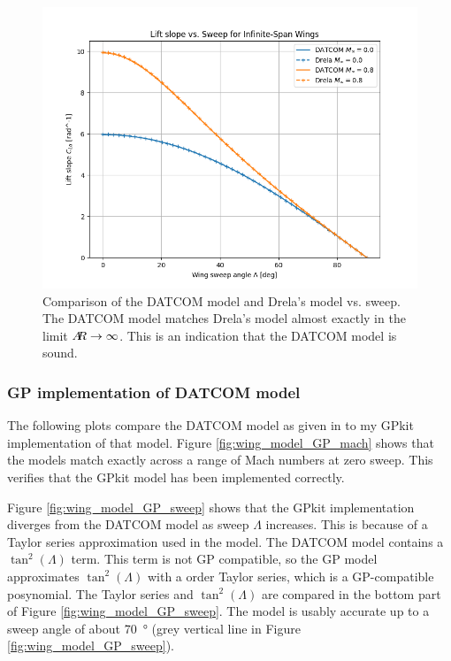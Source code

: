 \documentclass[12pt]{article}
\newcommand{\ar}{A\mkern-6mu R}
\begin{document}
\begin{figure}[hbt!]
    \centering
    \includegraphics[width=1\textwidth]{figures/wing_lift_model_compare/CLa_vs_sweep}
    \caption{\label{fig:wing_model_CLa_vs_sweep} Comparison of the DATCOM model and Drela's model vs. sweep. The DATCOM model matches Drela's model almost exactly in the limit $\ar \rightarrow \infty$. This is an indication that the DATCOM model is sound.}
\end{figure}


\subsubsection{GP implementation of DATCOM model}
The following plots compare the DATCOM model as given in \cite{Raymer2012} to my GPkit implementation of that model. Figure \ref{fig:wing_model_GP_mach} shows that the models match exactly across a range of Mach numbers at zero sweep. This verifies that the GPkit model has been implemented correctly.

Figure \ref{fig:wing_model_GP_sweep} shows that the GPkit implementation diverges from the DATCOM model as sweep $\Lambda$ increases. This is because of a Taylor series approximation used in the model. The DATCOM model contains a $\tan^2(\Lambda)$ term. This term is not GP compatible, so the GP model approximates $\tan^2(\Lambda)$ with a  order Taylor series, which is a GP-compatible posynomial. The Taylor series and $\tan^2(\Lambda)$ are compared in the bottom part of Figure \ref{fig:wing_model_GP_sweep}. The model is usably accurate up to a sweep angle of about \SI{70}{\degree} (grey vertical line in Figure \ref{fig:wing_model_GP_sweep}).
\end{document}
